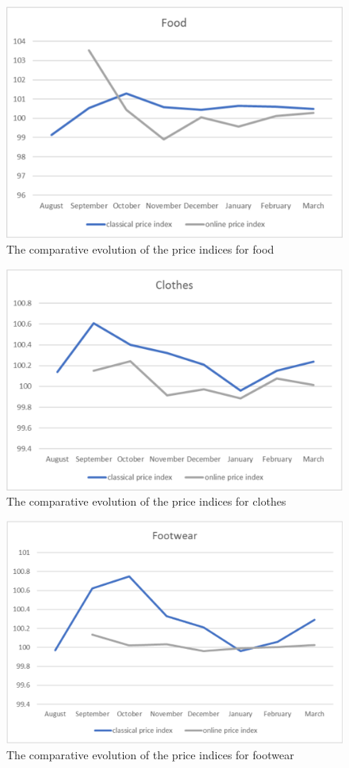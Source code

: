\documentclass[]{article}
\begin{document}
\begin{figure}
	\centering
	\includegraphics[width=0.7\linewidth]{fig3.eps}
	\caption{The comparative evolution of the price indices for food}
	\label{fig:3}
\end{figure}


\begin{figure}
	\centering
	\includegraphics[width=0.7\linewidth]{fig4.eps}
	\caption{The comparative evolution of the price indices for clothes}
	\label{fig:4}
\end{figure}


\begin{figure}
	\centering
	\includegraphics[width=0.7\linewidth]{fig5.eps}
	\caption{The comparative evolution of the price indices for footwear}
	\label{fig:5}
\end{figure}
\end{document}
